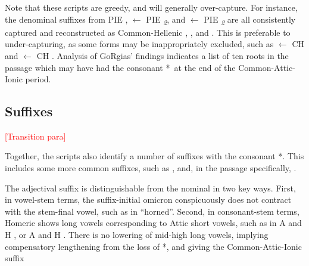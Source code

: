 

Note that these scripts are greedy, and will generally over-capture. For instance, the denominal suffixes  from PIE ,  $\gets$ PIE \textit{\textsubscript{2}}, and  $\gets$ PIE \textit{\textsubscript{2}} are all consistently captured and reconstructed as Common-Hellenic , , and . This is preferable to under-capturing, as some forms may be inappropriately excluded, such as  $\gets$ CH  and  $\gets$ CH  . Analysis of GoRgias' findings indicates a list of ten roots in the passage which may have had the consonant *\w\ at the end of the Common-Attic-Ionic period.



\subsection{Suffixes}

\noindent\textcolor{red}{[Transition para]}


Together, the scripts also identify a number of suffixes with the consonant *\w.
This includes some more common suffixes, such as , and,
in the passage specifically, .

The adjectival suffix  is distinguishable from the nominal  in two key ways. First, in vowel-stem terms, the suffix-initial omicron  conspicuously does not contract with the stem-final vowel, such as in  ``horned''. Second, in consonant-stem terms, Homeric shows long vowels corresponding to Attic short vowels, such as in A  and H , or A  and H . There is no lowering of mid-high long vowels, implying compensatory lengthening from the loss of *\w, and giving the Common-Attic-Ionic suffix 

